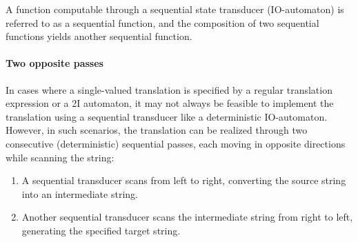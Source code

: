 A function computable through a sequential state transducer (IO-automaton) is referred to as a sequential function, and the composition of two sequential functions yields another sequential function.

\paragraph*{Two opposite passes}
In cases where a single-valued translation is specified by a regular translation expression or a 2I automaton, it may not always be feasible to implement the translation using a sequential transducer like a deterministic IO-automaton. 
However, in such scenarios, the translation can be realized through two consecutive (deterministic) sequential passes, each moving in opposite directions while scanning the string:
\begin{enumerate}
    \item A sequential transducer scans from left to right, converting the source string into an intermediate string.
    \item Another sequential transducer scans the intermediate string from right to left, generating the specified target string.
\end{enumerate}
